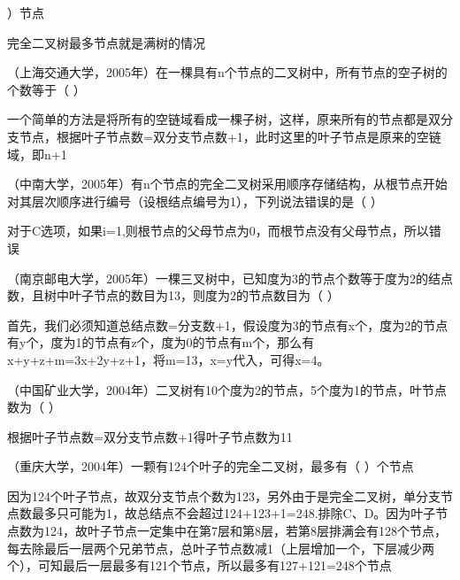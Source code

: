 ）节点
\par{}
\begin{solution}完全二叉树最多节点就是满树的情况
\end{solution}
\question （上海交通大学，2005年）在一棵具有n个节点的二叉树中，所有节点的空子树的个数等于（
）
\par{}
\begin{solution}一个简单的方法是将所有的空链域看成一棵子树，这样，原来所有的节点都是双分支节点，根据叶子节点数=双分支节点数+1，此时这里的叶子节点是原来的空链域，即n+1
\end{solution}
\question （中南大学，2005年）有n个节点的完全二叉树采用顺序存储结构，从根节点开始对其层次顺序进行编号（设根结点编号为1），下列说法错误的是（
）
\par{}
\begin{solution}对于C选项，如果i=1,则根节点的父母节点为0，而根节点没有父母节点，所以错误
\end{solution}
\question （南京邮电大学，2005年）一棵三叉树中，已知度为3的节点个数等于度为2的结点数，且树中叶子节点的数目为13，则度为2的节点数目为（
）
\par{}
\begin{solution}首先，我们必须知道总结点数=分支数+1，假设度为3的节点有x个，度为2的节点有y个，度为1的节点有z个，度为0的节点有m个，那么有x+y+z+m=3x+2y+z+1，将m=13，x=y代入，可得x=4。
\end{solution}
\question （中国矿业大学，2004年）二叉树有10个度为2的节点，5个度为1的节点，叶节点数为（
）
\par{}
\begin{solution}根据叶子节点数=双分支节点数+1得叶子节点数为11
\end{solution}
\question （重庆大学，2004年）一颗有124个叶子的完全二叉树，最多有（ ）个节点
\par{}
\begin{solution}因为124个叶子节点，故双分支节点个数为123，另外由于是完全二叉树，单分支节点数最多只可能为1，故总结点不会超过124+123+1=248.排除C、D。因为叶子节点数为124，故叶子节点一定集中在第7层和第8层，若第8层排满会有128个节点，每去除最后一层两个兄弟节点，总叶子节点数减1（上层增加一个，下层减少两个），可知最后一层最多有121个节点，所以最多有127+121=248个节点
\end{solution}
